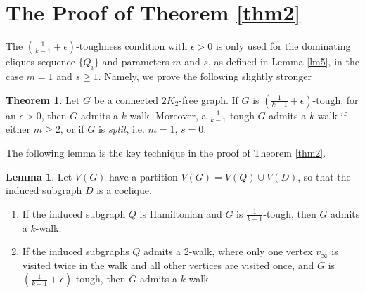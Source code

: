 \documentclass{amsart}
\theoremstyle{definition}
\newtheorem{theorem}{Theorem}
\newtheorem{lemma}{Lemma}
\begin{document}
\section{The Proof of Theorem \ref{thm2}}



The $(\frac{1}{k-1}+\epsilon)$-toughness condition with $\epsilon>0$ 
is only used for the dominating cliques sequence $\{Q_i\}$ 
and parameters $m$ and $s$, as defined in Lemma \ref{lm5},
in the case $m=1$ and $s\geq 1$. Namely, we prove the following
slightly stronger
\begin{theorem}\label{opt}
Let $G$ be a connected $2K_2$-free graph.
If $G$ is $\left(\frac{1}{k-1}+\epsilon\right)$-tough, for an
$\epsilon>0$, then $G$ admits a $k$-walk. 
Moreover, a $\frac{1}{k-1}$-tough $G$ admits a $k$-walk if either
$m\ge2$, or if $G$ is {\em split}, i.e. $m=1$, $s=0$.  
\end{theorem}




The following lemma is the key technique in the proof of Theorem \ref{thm2}.

\begin{lemma}\label{addtec}
Let $V(G)$ have a partition $V(G)=V(Q)\cup V(D)$, 
so that the induced subgraph $D$ is a coclique.
\begin{enumerate} 
\item If the induced subgraph $Q$ is Hamiltonian 
and $G$ is $\frac{1}{k-1}$-tough, 
then $G$ admits a $k$-walk.\label{itone}
\item If the induced subgraphs $Q$ admits a 2-walk, 
where only one vertex $v_{\infty}$ is visited twice in the walk 
and all other vertices are visited once, and $G$ is $(\frac{1}{k-1}+\epsilon)$-tough, then $G$ admits a $k$-walk.\label{ittwo}
\end{enumerate}
\end{lemma}
\end{document}
